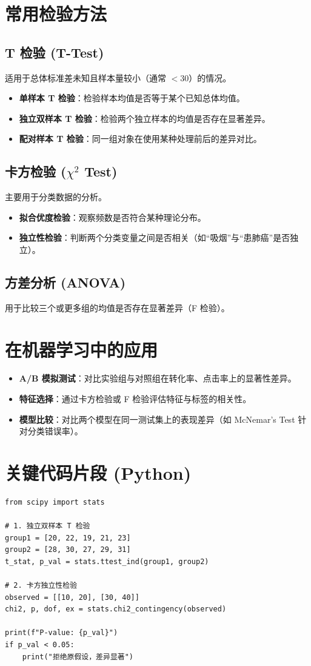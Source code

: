 \documentclass[12pt, a4paper]{article}
\begin{document}
\section{常用检验方法}

\subsection{T 检验 (T-Test)}
适用于总体标准差未知且样本量较小（通常 $<30$）的情况。
\begin{itemize}
    \item \textbf{单样本 T 检验}：检验样本均值是否等于某个已知总体均值。
    \item \textbf{独立双样本 T 检验}：检验两个独立样本的均值是否存在显著差异。
    \item \textbf{配对样本 T 检验}：同一组对象在使用某种处理前后的差异对比。
\end{itemize}

\subsection{卡方检验 ($\chi^2$ Test)}
主要用于分类数据的分析。
\begin{itemize}
    \item \textbf{拟合优度检验}：观察频数是否符合某种理论分布。
    \item \textbf{独立性检验}：判断两个分类变量之间是否相关（如“吸烟”与“患肺癌”是否独立）。
\end{itemize}

\subsection{方差分析 (ANOVA)}
用于比较三个或更多组的均值是否存在显著差异（F 检验）。

\section{在机器学习中的应用}
\begin{itemize}
    \item \textbf{A/B 模拟测试}：对比实验组与对照组在转化率、点击率上的显著性差异。
    \item \textbf{特征选择}：通过卡方检验或 F 检验评估特征与标签的相关性。
    \item \textbf{模型比较}：对比两个模型在同一测试集上的表现差异（如 McNemar's Test 针对分类错误率）。
\end{itemize}

\section{关键代码片段 (Python)}
\begin{lstlisting}
from scipy import stats

# 1. 独立双样本 T 检验
group1 = [20, 22, 19, 21, 23]
group2 = [28, 30, 27, 29, 31]
t_stat, p_val = stats.ttest_ind(group1, group2)

# 2. 卡方独立性检验
observed = [[10, 20], [30, 40]]
chi2, p, dof, ex = stats.chi2_contingency(observed)

print(f"P-value: {p_val}")
if p_val < 0.05:
    print("拒绝原假设，差异显著")
\end{lstlisting}
\end{document}
